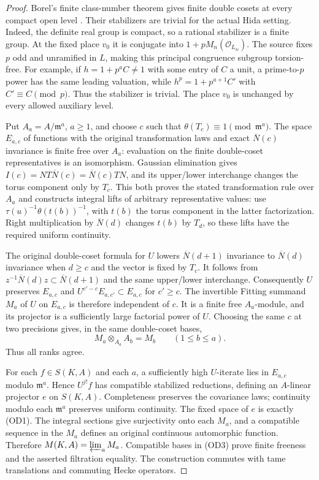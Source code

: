 \begin{proof}
Borel's finite class-number theorem gives finite double cosets at
every compact open level \cite{borel-ordinary-diamond}.
Their stabilizers are trivial for the actual Hida setting. Indeed,
the definite real group is compact, so a rational stabilizer is a
finite group. At the fixed place $v_0$ it is conjugate into
$1+pM_n(\mathcal O_{L_w})$. The source fixes $p$ odd and unramified
in $L$, making this principal congruence subgroup torsion-free.
For example, if $h=1+p^aC\ne1$ with some entry of $C$ a unit, a
prime-to-$p$ power has the same leading valuation, while
$h^p=1+p^{a+1}C'$ with $C'\equiv C\pmod p$.
Thus the stabilizer is trivial. The place $v_0$ is unchanged by
every allowed auxiliary level.

Put $A_a=A/\mathfrak m^a$, $a\geq1$, and choose $c$ such that
$\theta(T_c)\equiv1\pmod{\mathfrak m^a}$. The space $E_{a,c}$ of
functions with the original transformation laws and exact
$\overline N(c)$ invariance is finite free over $A_a$: evaluation
on the finite double-coset representatives is an isomorphism.
Gaussian elimination gives
$I(c)=NT\overline N(c)=\overline N(c)TN$, and its upper/lower
interchange changes the torus component only by $T_c$. This
both proves the stated transformation rule over $A_a$ and
constructs integral lifts of arbitrary representative values:
use $\tau(u)^{-1}\theta(t(b))^{-1}$, with $t(b)$ the torus
component in the latter factorization. Right multiplication by
$\overline N(d)$ changes $t(b)$ by $T_d$, so these lifts have
the required uniform continuity.

The original double-coset formula for $U$ lowers
$\overline N(d+1)$ invariance to $\overline N(d)$ invariance
when $d\geq c$ and the vector is fixed by $T_c$. It follows
from $z^{-1}\overline N(d)z\subset\overline N(d+1)$ and the
same upper/lower interchange. Consequently $U$ preserves
$E_{a,c}$ and
$U^{c'-c}E_{a,c'}\subset E_{a,c}$ for $c'\geq c$.
The invertible Fitting summand $M_a$ of $U$ on $E_{a,c}$ is
therefore independent of $c$. It is a finite free $A_a$-module,
and its projector is a sufficiently large factorial power of $U$.
Choosing the same $c$ at two precisions gives, in the same
double-coset bases,
\[
 M_a\otimes_{A_a}A_b=M_b\qquad(1\leq b\leq a).
 \tag{OD3}
\]
Thus all ranks agree.

For each $f\in S(K,A)$ and each $a$, a sufficiently high
$U$-iterate lies in $E_{a,c}$ modulo $\mathfrak m^a$.
Hence $U^{j!}f$ has compatible stabilized reductions, defining
an $A$-linear projector $e$ on $S(K,A)$. Completeness preserves
the covariance laws; continuity modulo each $\mathfrak m^a$
preserves uniform continuity. The fixed space of $e$ is exactly
(OD1). The integral sections give surjectivity onto each $M_a$,
and a compatible sequence in the $M_a$ defines an original
continuous automorphic function. Therefore
$M(K,A)=\varprojlim_aM_a$. Compatible bases in (OD3) prove
finite freeness and the asserted filtration equality.
The construction commutes with tame translations and commuting
Hecke operators.


\end{proof}
